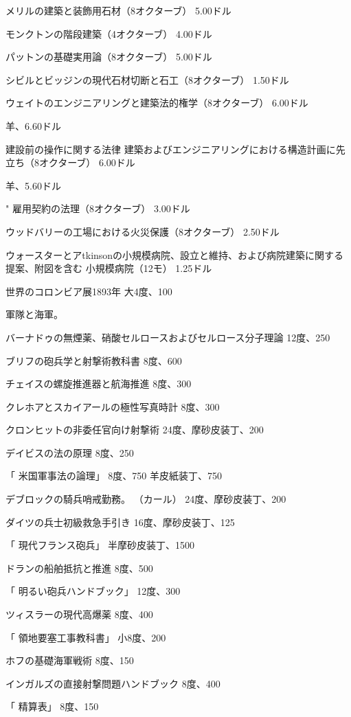 \documentclass[a4paper,11pt,openany]{ltjsbook}
\begin{document}
メリルの建築と装飾用石材（8オクターブ） 5.00ドル

モンクトンの階段建築（4オクターブ） 4.00ドル

パットンの基礎実用論（8オクターブ） 5.00ドル

シビルとビッジンの現代石材切断と石工（8オクターブ） 1.50ドル

ウェイトのエンジニアリングと建築法的権学（8オクターブ） 6.00ドル

羊、6.60ドル

建設前の操作に関する法律 建築およびエンジニアリングにおける構造計画に先立ち（8オクターブ） 6.00ドル

羊、5.60ドル

"         雇用契約の法理（8オクターブ） 3.00ドル

ウッドバリーの工場における火災保護（8オクターブ） 2.50ドル

ウォースターとアtkinsonの小規模病院、設立と維持、および病院建築に関する提案、附図を含む 小規模病院（12モ） 1.25ドル

世界のコロンビア展1893年 大4度、100

軍隊と海軍。

バーナドゥの無煙薬、硝酸セルロースおよびセルロース分子理論 12度、250

ブリフの砲兵学と射撃術教科書 8度、600

チェイスの螺旋推進器と航海推進 8度、300

クレホアとスカイアールの極性写真時計 8度、300

クロンヒットの非委任官向け射撃術 24度、摩砂皮装丁、200

デイビスの法の原理 8度、250

「      米国軍事法の論理」 8度、750 羊皮紙装丁、750

デブロックの騎兵哨戒勤務。 （カール） 24度、摩砂皮装丁、200

ダイツの兵士初級救急手引き 16度、摩砂皮装丁、125

「      現代フランス砲兵」 半摩砂皮装丁、1500

ドランの船舶抵抗と推進 8度、500

「      明るい砲兵ハンドブック」 12度、300

ツィスラーの現代高爆薬 8度、400

「      領地要塞工事教科書」 小8度、200

ホフの基礎海軍戦術 8度、150

インガルズの直接射撃問題ハンドブック 8度、400

「      精算表」 8度、150
\end{document}
